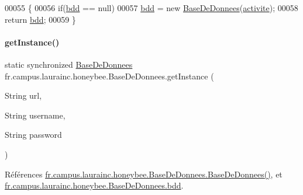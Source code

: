 \begin{DoxyCode}
00055     \{
00056         \textcolor{keywordflow}{if}(\hyperlink{classfr_1_1campus_1_1laurainc_1_1honeybee_1_1_base_de_donnees_a6afcd3f4c69f15afa0c675a848bf97a7}{bdd} == null)
00057             \hyperlink{classfr_1_1campus_1_1laurainc_1_1honeybee_1_1_base_de_donnees_a6afcd3f4c69f15afa0c675a848bf97a7}{bdd} = \textcolor{keyword}{new} \hyperlink{classfr_1_1campus_1_1laurainc_1_1honeybee_1_1_base_de_donnees_ac4d0c514f439b3a19dc35c159955373a}{BaseDeDonnees}(\hyperlink{classfr_1_1campus_1_1laurainc_1_1honeybee_1_1_base_de_donnees_aad4fd29f29916bc4277fa16262d19431}{activite});
00058         \textcolor{keywordflow}{return} \hyperlink{classfr_1_1campus_1_1laurainc_1_1honeybee_1_1_base_de_donnees_a6afcd3f4c69f15afa0c675a848bf97a7}{bdd};
00059     \}
\end{DoxyCode}
\mbox{\label{classfr_1_1campus_1_1laurainc_1_1honeybee_1_1_base_de_donnees_aca2ad0b53f5c21c6a16a7956646c195b}} 
\paragraph{\texorpdfstring{get\+Instance()}{getInstance()}\hspace{0.1cm}{\footnotesize\ttfamily [3/4]}}
{\footnotesize\ttfamily static synchronized \hyperlink{classfr_1_1campus_1_1laurainc_1_1honeybee_1_1_base_de_donnees}{Base\+De\+Donnees} fr.\+campus.\+laurainc.\+honeybee.\+Base\+De\+Donnees.\+get\+Instance (\begin{DoxyParamCaption}\item[{String}]{url,  }\item[{String}]{username,  }\item[{String}]{password }\end{DoxyParamCaption})\hspace{0.3cm}{\ttfamily [static]}}



Références \hyperlink{classfr_1_1campus_1_1laurainc_1_1honeybee_1_1_base_de_donnees_ac4d0c514f439b3a19dc35c159955373a}{fr.\+campus.\+laurainc.\+honeybee.\+Base\+De\+Donnees.\+Base\+De\+Donnees()}, et \hyperlink{classfr_1_1campus_1_1laurainc_1_1honeybee_1_1_base_de_donnees_a6afcd3f4c69f15afa0c675a848bf97a7}{fr.\+campus.\+laurainc.\+honeybee.\+Base\+De\+Donnees.\+bdd}.


